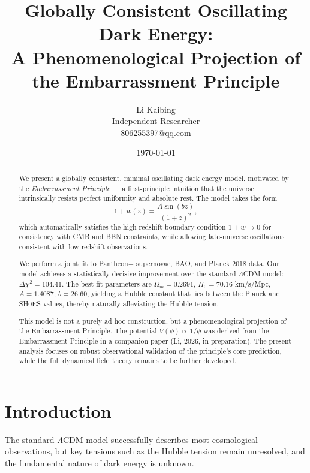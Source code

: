 \documentclass[10pt,twocolumn]{article}
\begin{document}
\title{
Globally Consistent Oscillating Dark Energy: \\
A Phenomenological Projection of the Embarrassment Principle
}

\author{Li Kaibing \\
Independent Researcher \\
806255397@qq.com}

\date{\today}

\maketitle

\begin{abstract}
We present a globally consistent, minimal oscillating dark energy model,
motivated by the \emph{Embarrassment Principle} — a first-principle intuition
that the universe intrinsically resists perfect uniformity and absolute rest.
The model takes the form
\[
1+w(z) = \frac{A\sin(bz)}{(1+z)^2},
\]
which automatically satisfies the high-redshift boundary condition $1+w\to0$
for consistency with CMB and BBN constraints, while allowing
late-universe oscillations consistent with low-redshift observations.

We perform a joint fit to Pantheon+ supernovae, BAO, and Planck 2018 data.
Our model achieves a statistically decisive improvement over the standard
$\Lambda$CDM model: $\Delta\chi^2=104.41$. The best-fit parameters are
$\Omega_m=0.2691$, $H_0=70.16$ km/s/Mpc, $A=1.4087$, $b=26.60$,
yielding a Hubble constant that lies between the Planck and SH0ES values,
thereby naturally alleviating the Hubble tension.

This model is not a purely ad hoc construction,
but a phenomenological projection of the Embarrassment Principle.
The potential $V(\phi)\propto 1/\phi$ was derived from the Embarrassment Principle
in a companion paper (Li, 2026, in preparation).
The present analysis focuses on robust observational validation
of the principle’s core prediction, while the full dynamical field theory
remains to be further developed.
\end{abstract}

\section{Introduction}
The standard $\Lambda$CDM model successfully describes most cosmological
observations, but key tensions such as the Hubble tension remain unresolved,
and the fundamental nature of dark energy is unknown.
\end{document}
